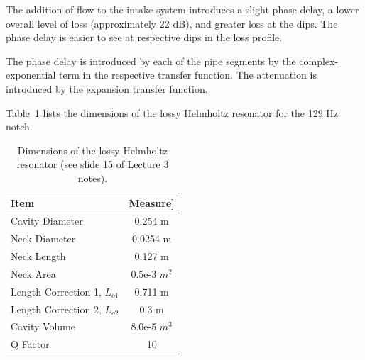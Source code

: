 {{{\vspace{0.25cm}
The addition of flow to the intake system introduces a slight phase delay, a lower overall level of loss (approximately 22 dB), and greater loss at the dips.  The phase delay is easier to see at respective dips in the loss profile.

\vspace{0.25cm}
The phase delay is introduced by each of the pipe segments by the complex-exponential term in the respective transfer function.  The attenuation is introduced by the expansion transfer function.


\newpage
Table~\ref{table:helmholzResonator} lists the dimensions of the lossy Helmholtz resonator for the 129 Hz notch.

\setlength{\abovecaptionskip}{0pt}
\vspace{0.1cm}
{\renewcommand{\arraystretch}{1.5}
\begin{table}[h!]
    \begin{center}
        \small
        \begin{tabular}{ | l | c | }
            \hline
            \textbf{Item}  &  \textbf{Measure]}  \\
            \hline
                Cavity Diameter                 &  0.254 m  \\
                \hline
                \rowcolor{Gray}
                Neck Diameter                   &  0.0254 m  \\
                \hline
                Neck Length                     &  0.127 m  \\
                \hline
                \rowcolor{Gray}
                Neck Area                       &  0.5e-3 $m^2$  \\
                \hline
                Length Correction 1, $L_{o1}$   &  0.711 m  \\
                \hline
                \rowcolor{Gray}
                Length Correction 2, $L_{o2}$   &  0.3 m  \\
                \hline
                Cavity Volume                   &  8.0e-5 $m^3$  \\
                \hline
                \rowcolor{Gray}
                Q Factor   &  10  \\
            \hline
        \end{tabular}
    \end{center}
    \caption{Dimensions of the lossy Helmholtz resonator (see slide 15 of Lecture 3 notes).}
    \label{table:helmholzResonator}
\end{table}

}}}}
